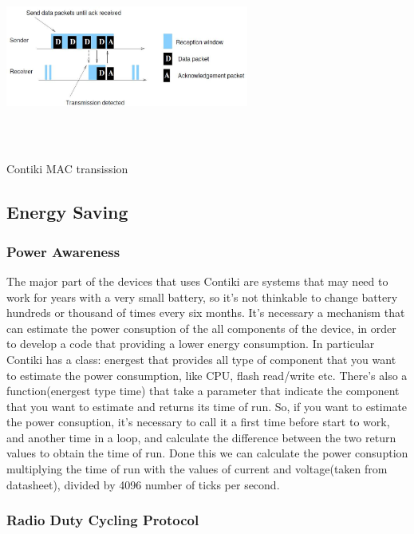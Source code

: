 \documentclass[a4paper,10pt]{article}
\makeatletter
\newenvironment{figurehere}{\def\@captype{figure}\vspace{2ex}}{\vspace{2ex}}
\makeatother
\begin{document}
\begin{multicols}{2}
\begin{figurehere}
 \centering
 \includegraphics[width=8cm, height=6cm]{./eps/ContikiMAC.eps}
 \caption{Contiki MAC transission}
 \label{fig:myMAC}
\end{figurehere}


\subsection{Energy Saving}

\subsubsection{Power Awareness}
The major part of the devices that uses Contiki are systems that may need to work for years with a very small battery, so it's not thinkable to  change battery hundreds or thousand of times every six months. It's necessary a mechanism that can estimate the power consuption of the all components of the device, in order to develop a code that providing a lower energy consumption.
In particular Contiki has a class: energest that provides all type of component that you want to estimate the power consumption, like CPU, flash read/write etc. There's also a function(energest type time) that take a parameter that indicate the component that you want to estimate and returns its time of run. So, if you want to estimate the power consuption, it's necessary to call it a first time before start to work, and another time in a loop, and calculate the difference between the two return values to obtain the time of run. Done this we can calculate the power consuption multiplying the time of run with the values of current and voltage(taken from datasheet), divided by 4096 number of ticks per second.



\subsubsection{Radio Duty Cycling Protocol}


\end{multicols}
\end{document}
